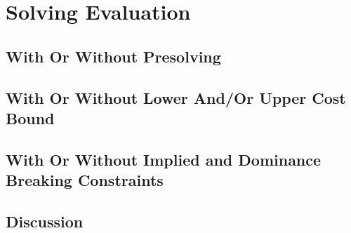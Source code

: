 %

\chapter{Solving Evaluation}

\section{With Or Without Presolving}
\section{With Or Without Lower And/Or Upper Cost Bound}
\section{With Or Without Implied and Dominance Breaking Constraints}
\section{Discussion}
